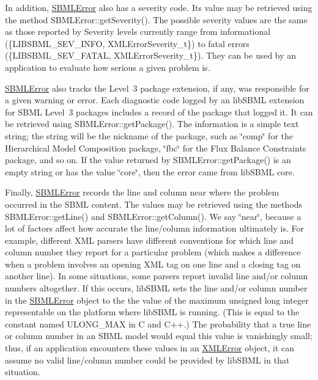In addition, \hyperlink{class_s_b_m_l_error}{S\+B\+M\+L\+Error} also has a severity code. Its value may be retrieved using the method S\+B\+M\+L\+Error\+::get\+Severity(). The possible severity values are the same as those reported by Severity levels currently range from informational (\{L\+I\+B\+S\+B\+M\+L\+\_\+\+S\+E\+V\+\_\+\+I\+N\+FO, X\+M\+L\+Error\+Severity\+\_\+t\}) to fatal errors (\{L\+I\+B\+S\+B\+M\+L\+\_\+\+S\+E\+V\+\_\+\+F\+A\+T\+AL, X\+M\+L\+Error\+Severity\+\_\+t\}). They can be used by an application to evaluate how serious a given problem is.

\hyperlink{class_s_b_m_l_error}{S\+B\+M\+L\+Error} also tracks the Level~3 package extension, if any, was responsible for a given warning or error. Each diagnostic code logged by an lib\+S\+B\+ML extension for S\+B\+ML Level~3 packages includes a record of the package that logged it. It can be retrieved using S\+B\+M\+L\+Error\+::get\+Package(). The information is a simple text string; the string will be the nickname of the package, such as {\ttfamily \char`\"{}comp\char`\"{}} for the Hierarchical Model Composition package, {\ttfamily \char`\"{}fbc\char`\"{}} for the Flux Balance Constraints package, and so on. If the value returned by S\+B\+M\+L\+Error\+::get\+Package() is an empty string or has the value {\ttfamily \char`\"{}core\char`\"{}}, then the error came from lib\+S\+B\+ML core.

Finally, \hyperlink{class_s_b_m_l_error}{S\+B\+M\+L\+Error} records the line and column near where the problem occurred in the S\+B\+ML content. The values may be retrieved using the methods S\+B\+M\+L\+Error\+::get\+Line() and S\+B\+M\+L\+Error\+::get\+Column(). We say \char`\"{}near\char`\"{}, because a lot of factors affect how accurate the line/column information ultimately is. For example, different X\+ML parsers have different conventions for which line and column number they report for a particular problem (which makes a difference when a problem involves an opening X\+ML tag on one line and a closing tag on another line). In some situations, some parsers report invalid line and/or column numbers altogether. If this occurs, lib\+S\+B\+ML sets the line and/or column number in the \hyperlink{class_s_b_m_l_error}{S\+B\+M\+L\+Error} object to the the value of the maximum unsigned long integer representable on the platform where lib\+S\+B\+ML is running. (This is equal to the constant named {\ttfamily U\+L\+O\+N\+G\+\_\+\+M\+AX} in C and C++.) The probability that a true line or column number in an S\+B\+ML model would equal this value is vanishingly small; thus, if an application encounters these values in an \hyperlink{class_x_m_l_error}{X\+M\+L\+Error} object, it can assume no valid line/column number could be provided by lib\+S\+B\+ML in that situation.

